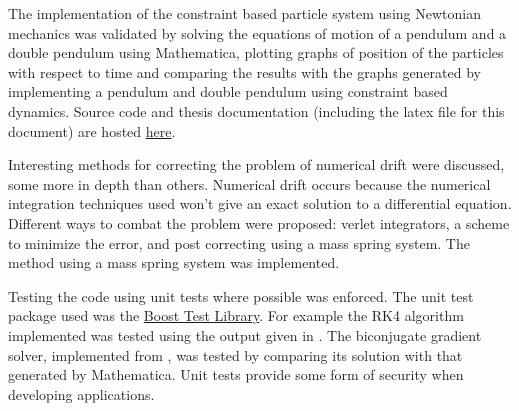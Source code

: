 \documentclass[12pt]{report}
\begin{document}
The implementation of the constraint based particle system using Newtonian
mechanics was validated by solving the equations of motion \cite{MyPhysicsLab}
of a pendulum and a double pendulum using Mathematica, plotting graphs of
position of the particles with respect to time and comparing the results with
the graphs generated by implementing a pendulum and double pendulum using
constraint based dynamics. Source code and thesis documentation (including the
latex file for this document) are hosted \href{http://edge.bkbits.net/}{here}.

Interesting methods for correcting the problem of numerical drift were
discussed, some more in depth than others. Numerical drift occurs because the
numerical integration techniques used won't give an exact solution to a
differential equation. Different ways to combat the problem were proposed:
verlet integrators, a scheme to minimize the error, and post correcting using a
mass spring system. The method using a mass spring system was implemented. 

Testing the code using unit tests where possible was enforced. The unit test
package used was the \href{http://www.boost.org/libs/test/doc/index.htm}{Boost
Test Library}. For example the RK4 algorithm implemented was tested using the
output given in \cite{NagleSaff}. The biconjugate gradient solver, implemented
from \cite{NumRecipes}, was tested by comparing its solution with that generated
by Mathematica. Unit tests provide some form of security when developing
applications.



\end{document}

